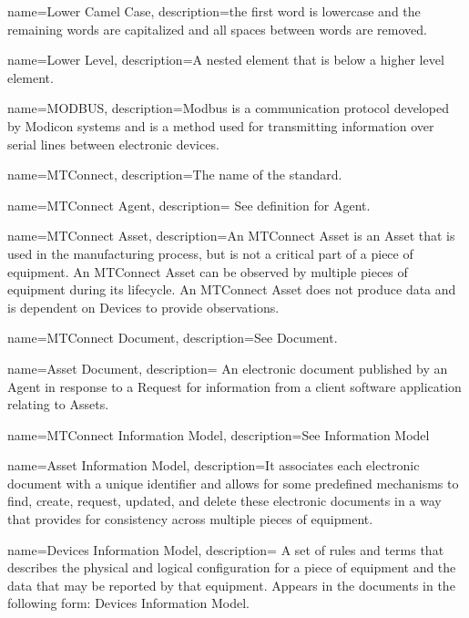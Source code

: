 {
    name={Lower Camel Case},
	description={the first word is lowercase and the remaining words are capitalized and all spaces between words are removed.}
}

{
    name={Lower Level},
	description={A nested element that is below a higher level element.}
}

{
    name={MODBUS},
	description={Modbus is a communication protocol developed by Modicon systems and is a method used for transmitting information over serial lines between electronic devices.}
}

{
    name={MTConnect},
	description={The name of the standard.}
}

{
    name={MTConnect Agent},
	description={
	See definition for \gls{Agent}.
}
}

{
    name={MTConnect Asset},
	description={An \gls{MTConnect Asset} is an \gls{Asset} that is used in the manufacturing process, but is not a critical part of a piece of equipment. An \gls{MTConnect Asset} can be observed by multiple pieces of equipment during its lifecycle.
An \gls{MTConnect Asset} does not produce data and is dependent on \gls{Devices} to provide observations.
}
}

{
    name={MTConnect Document},
	description={See \gls{Document}.}
}

{
    name={Asset Document},
	description={
	An electronic document published by an \gls{Agent} in response to a \gls{Request} for information from a client software application relating to Assets.
}
}

{
    name={MTConnect Information Model},
	description={See \gls{Information Model}}
}

{
    name={Asset Information Model},
	description={It associates each electronic  document with a unique identifier and allows for some predefined mechanisms to find, create, request, updated, and delete these electronic documents in a way that provides for consistency across multiple pieces of equipment.}
}

{
    name={Devices Information Model},
	description={
	A set of rules and terms that describes the physical and logical configuration for a piece of equipment and the data that may be reported by that equipment.    
	Appears in the documents in the following form: \gls{Devices Information Model}.
}
}

